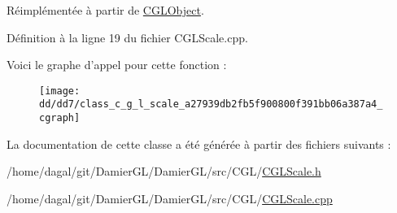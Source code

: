 Réimplémentée à partir de \hyperlink{class_c_g_l_object_a2781ec98c37bd209f2382c5130a365b9}{C\-G\-L\-Object}.



Définition à la ligne 19 du fichier C\-G\-L\-Scale.\-cpp.



Voici le graphe d'appel pour cette fonction \-:
\nopagebreak
\begin{figure}[H]
\begin{center}
\leavevmode
\texttt{[image: dd/dd7/class\_c\_g\_l\_scale\_a27939db2fb5f900800f391bb06a387a4\_cgraph]}
\end{center}
\end{figure}




La documentation de cette classe a été générée à partir des fichiers suivants \-:\begin{DoxyCompactItemize}
\item 
/home/dagal/git/\-Damier\-G\-L/\-Damier\-G\-L/src/\-C\-G\-L/\hyperlink{_c_g_l_scale_8h}{C\-G\-L\-Scale.\-h}\item 
/home/dagal/git/\-Damier\-G\-L/\-Damier\-G\-L/src/\-C\-G\-L/\hyperlink{_c_g_l_scale_8cpp}{C\-G\-L\-Scale.\-cpp}\end{DoxyCompactItemize}
